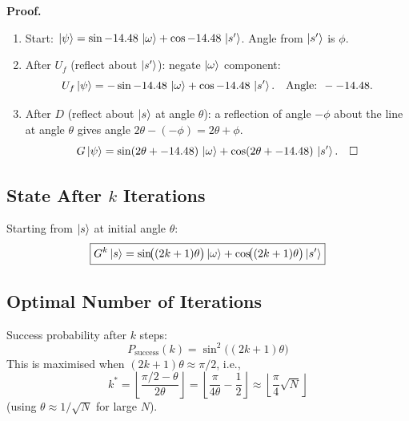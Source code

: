 \documentclass[12pt,a4paper]{article}
\begin{document}
\textbf{Proof.}
\begin{enumerate}
  \item Start: $\ket{\psi} = \sin-14.48\,\ket{\omega} + \cos-14.48\,\ket{s'}$. Angle from $\ket{s'}$ is $\phi$.
  \item After $U_f$ (reflect about $\ket{s'}$): negate $\ket{\omega}$ component:
  \[
    U_f\ket{\psi} = -\sin-14.48\,\ket{\omega} + \cos-14.48\,\ket{s'}. \quad\text{Angle: }--14.48.
  \]
  \item After $D$ (reflect about $\ket{s}$ at angle $\theta$): a reflection of angle $-\phi$ about the line at angle $\theta$ gives angle $2\theta-(-\phi) = 2\theta+\phi$.
  \[
    G\ket{\psi} = \sin(2\theta+-14.48)\,\ket{\omega} + \cos(2\theta+-14.48)\,\ket{s'}.\quad\square
  \]
\end{enumerate}

\subsection{State After $k$ Iterations}

Starting from $\ket{s}$ at initial angle $\theta$:
\[
  \boxed{G^k\ket{s} = \sin\!\bigl((2k+1)\theta\bigr)\ket{\omega} + \cos\!\bigl((2k+1)\theta\bigr)\ket{s'}}
\]

\subsection{Optimal Number of Iterations}

Success probability after $k$ steps:
\[
  P_{\text{success}}(k) = \sin^2\!\bigl((2k+1)\theta\bigr)
\]
This is maximised when $(2k+1)\theta \approx \pi/2$, i.e.,
\[
  k^* = \left\lfloor\frac{\pi/2 - \theta}{2\theta}\right\rfloor
       = \left\lfloor\frac{\pi}{4\theta} - \frac{1}{2}\right\rfloor
       \approx \left\lfloor\frac{\pi}{4}\sqrt{N}\right\rfloor
\]
(using $\theta \approx 1/\sqrt{N}$ for large $N$).
\end{document}
